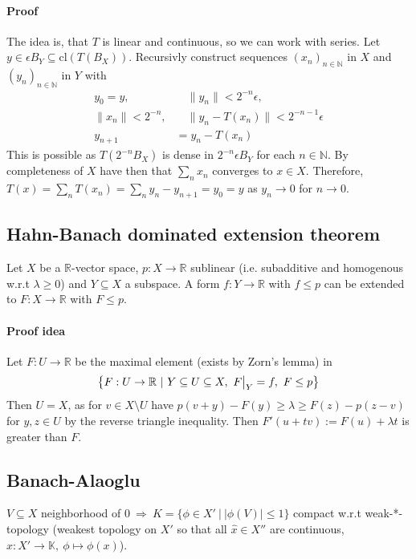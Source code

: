 \documentclass{scrartcl}
\newcommand{\R}{\mathbb{R}}
\newcommand{\N}{\mathbb{N}}
\newcommand\restr[2]{{
    \left.\kern-\nulldelimiterspace
    #1
    \vphantom{\big|}
    \right|_{#2}
}}
\begin{document}
\paragraph{Proof} The idea is, that $T$ is linear and continuous, so we can work with series. Let $y \in \epsilon B_Y \subseteq \mathrm{cl}(T(B_X))$. Recursivly construct sequences $(x_n)_{n \in \N}$ in $X$ and $(y_n)_{n \in \N}$ in $Y$ with
\begin{align*}
    y_0 = y, &\quad \| y_n \| < 2^{-n}\epsilon, \\
    \| x_n \| < 2^{-n}, &\quad \| y_n - T(x_n) \| < 2^{-n-1} \epsilon \\
    y_{n + 1} &= y_n - T(x_n)
\end{align*}
This is possible as $T(2^{-n}B_X)$ is dense in $2^{-n}\epsilon B_Y$ for each $n \in \N$. By completeness of $X$ have then that $\sum_n x_n$ converges to $x \in X$. Therefore, $T(x) = \sum_n T(x_n) = \sum_n y_n - y_{n + 1} = y_0 = y$ as $y_n \to 0$ for $n \to 0$.

\subsection{Hahn-Banach dominated extension theorem}
Let $X$ be a $\R$-vector space, $p: X \to \R$ sublinear (i.e. subadditive and homogenous w.r.t $\lambda \geq 0$) and $Y \subseteq X$ a subspace. A form $f: Y \to \R$ with $f \leq p$ can be extended to $F: X \to \R$ with $F \leq p$.
\paragraph{Proof idea} Let $F: U \to \R$ be the maximal element (exists by Zorn's lemma) in \begin{equation}
    \left\{ F: U \to \R \ | \ Y \subseteq U \subseteq X, \ \restr{F}{Y} = f, \ F \leq p \right\}  \nonumber
\end{equation}
Then $U = X$, as for $v \in X \setminus U$ have $p(v + y) - F(y) \geq \lambda \geq F(z) - p(z - v)$ for $y, z \in U$ by the reverse triangle inequality. Then $F'(u + tv) := F(u) + \lambda t$ is greater than $F$.

\subsection{Banach-Alaoglu}
$V \subseteq X$ neighborhood of $0 \ \Rightarrow \ K = \{ \phi \in X' \ | \ |\phi(V)| \leq 1 \}$ compact w.r.t weak-*-topology (weakest topology on $X'$ so that all $\hat{x} \in X''$ are continuous, $\hat{x}: X' \to \mathbb{K}, \ \phi \mapsto \phi(x)$).
\end{document}
